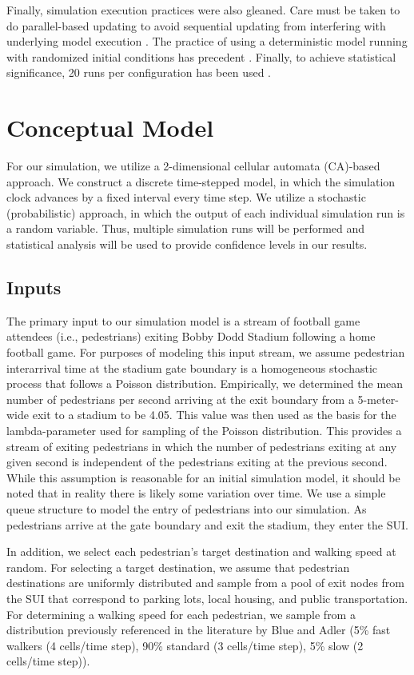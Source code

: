 \documentclass[12pt]{article}
\begin{document}
Finally, simulation execution practices were also gleaned. Care must be taken
to do parallel-based updating to avoid sequential updating from interfering with
underlying model execution \cite{blue2001cellular}. The practice of using
a deterministic model running with randomized initial conditions has precedent
\cite{biham1992self}. Finally, to achieve statistical significance, 20 runs per
configuration has been used \cite{blue2001cellular}.

\section{Conceptual Model}
For our simulation, we utilize a 2-dimensional cellular automata (CA)-based
approach. We construct a discrete time-stepped model, in which the simulation
clock advances by a fixed interval every time step. We utilize a stochastic
(probabilistic) approach, in which the output of each individual simulation
run is a random variable. Thus, multiple simulation runs will be performed and
statistical analysis will be used to provide confidence levels in our results.

\subsection{Inputs}
The primary input to our simulation model is a stream of football game attendees
(i.e., pedestrians) exiting Bobby Dodd Stadium following a home football game.
For purposes of modeling this input stream, we assume pedestrian interarrival
time at the stadium gate boundary is a homogeneous stochastic process that
follows a Poisson distribution. Empirically, we determined the mean number of
pedestrians per second arriving at the exit boundary from a 5-meter-wide exit to
a stadium to be 4.05. This value was then used as the basis for the
lambda-parameter used for sampling of the Poisson distribution. This provides
a stream of exiting pedestrians in which the number of pedestrians exiting at
any given second is independent of the pedestrians exiting at the previous
second. While this assumption is reasonable for an initial simulation model, it
should be noted that in reality there is likely some variation over time. We use
a simple queue structure to model the entry of pedestrians into our simulation.
As pedestrians arrive at the gate boundary and exit the stadium, they enter the
SUI.

In addition, we select each pedestrian's target destination and walking
speed at random. For selecting a target destination, we assume that pedestrian
destinations are uniformly distributed and sample from a pool of exit nodes
from the SUI that correspond to parking lots, local housing, and public
transportation. For determining a walking speed for each pedestrian, we sample
from a distribution previously referenced in the literature by Blue and Adler
\cite{blue2001cellular} (5\% fast walkers (4 cells/time step), 90\% standard
(3 cells/time step), 5\% slow (2 cells/time step)).
\end{document}
